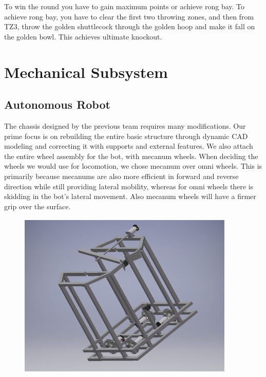\documentclass[11pt]{article}
\begin{document}
To win the round you have to gain maximum points or achieve rong bay.
To achieve rong bay, you have to clear the first two throwing zones, and then from TZ3, throw the golden shuttlecock through the golden hoop and make it fall on the golden bowl. This achieves ultimate knockout.

\pagebreak


\pagebreak

\section{Mechanical Subsystem}
\subsection{Autonomous Robot}
The chassis designed by the previous team requires many modifications. Our prime focus is on rebuilding the entire basic structure through dynamic CAD modeling and correcting it with supports and external features.
We also attach the entire wheel assembly for the bot, with mecanum wheels. When deciding the wheels we would use for locomotion, we chose mecanum over omni wheels. This is primarily because mecanums are also more efficient in forward and reverse direction while still providing lateral mobility, whereas for omni wheels there is skidding in the bot's lateral movement. Also mecanum wheels will have a firmer grip over the surface.

\begin{figure}[!htb]
\centering
\includegraphics[scale=0.8]{chassis.png}
\end{figure}
\end{document}
